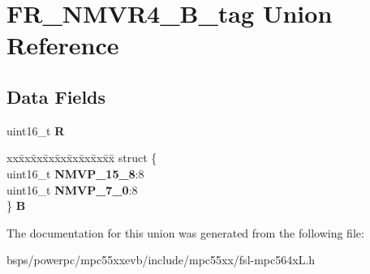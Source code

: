 \hypertarget{unionFR__NMVR4__16B__tag}{}\section{F\+R\+\_\+\+N\+M\+V\+R4\+\_\+B\+\_\+tag Union Reference}
\label{unionFR__NMVR4__16B__tag}
\subsection*{Data Fields}
\begin{DoxyCompactItemize}
\item 
\mbox{\label{unionFR__NMVR4__16B__tag_acb67d4831e6a33a748db4c346d25e8c7}} 
uint16\+\_\+t {\bfseries R}
\item 
\mbox{\label{unionFR__NMVR4__16B__tag_a0a4cbbd4b790cc1a4c23ed518ad8a17a}} 
\begin{tabbing}
xx\=xx\=xx\=xx\=xx\=xx\=xx\=xx\=xx\=\kill
struct \{\\
\>uint16\_t {\bfseries NMVP\_15\_8}:8\\
\>uint16\_t {\bfseries NMVP\_7\_0}:8\\
\} {\bfseries B}\\

\end{tabbing}\end{DoxyCompactItemize}


The documentation for this union was generated from the following file\+:\begin{DoxyCompactItemize}
\item 
bsps/powerpc/mpc55xxevb/include/mpc55xx/fsl-\/mpc564x\+L.\+h\end{DoxyCompactItemize}
